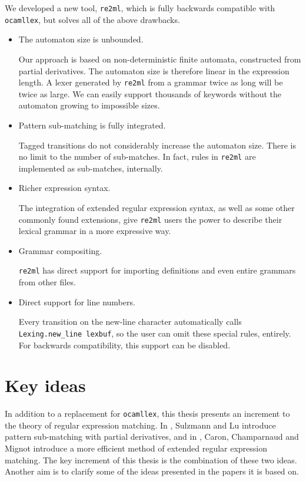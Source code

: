 We developed a new tool, \texttt{re2ml}, which is fully backwards compatible
with \texttt{ocamllex}, but solves all of the above drawbacks.

\begin{itemize}
   \item The automaton size is unbounded.

      Our approach is based on non-deterministic finite automata, constructed
      from partial derivatives. The automaton size is therefore linear in the
      expression length. A lexer generated by \texttt{re2ml} from a grammar
      twice as long will be twice as large. We can easily support thousands of
      keywords without the automaton growing to impossible sizes.

   \item Pattern sub-matching is fully integrated.

      Tagged transitions do not considerably increase the automaton size. There
      is no limit to the number of sub-matches. In fact, rules in \texttt{re2ml}
      are implemented as sub-matches, internally.

   \item Richer expression syntax.

      The integration of extended regular expression syntax, as well as some
      other commonly found extensions, give \texttt{re2ml} users the power to
      describe their lexical grammar in a more expressive way.

   \item Grammar compositing.

      \texttt{re2ml} has direct support for importing definitions and even
      entire grammars from other files.

   \item Direct support for line numbers.

      Every transition on the new-line character automatically calls
      \texttt{Lexing.new\_line lexbuf}, so the user can omit these special
      rules, entirely. For backwards compatibility, this support can be
      disabled.

\end{itemize}


\section{Key ideas}

In addition to a replacement for \texttt{ocamllex}, this thesis presents an
increment to the theory of regular expression matching. In \cite{pdpat},
Sulzmann and Lu introduce pattern sub-matching with partial derivatives, and in
\cite{pdere}, Caron, Champarnaud and Mignot introduce a more efficient method of
extended regular expression matching. The key increment of this thesis is the
combination of these two ideas. Another aim is to clarify some of the ideas
presented in the papers it is based on.


